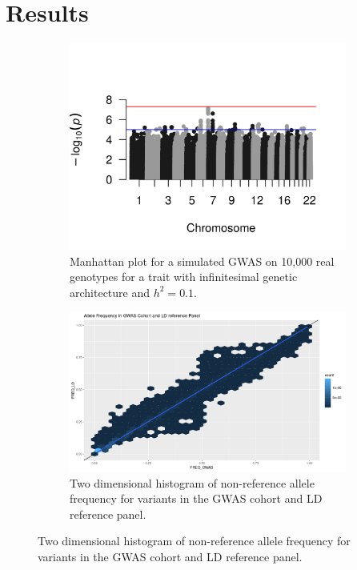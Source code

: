 \section{Results}\label{sec:org26555b8}

\begin{figure}
  \centering
  \begin{subfigure}[t]{\textwidth}
    \centering
    \includegraphics[width=\linewidth]{img/rssp_01.png}
    \caption{Manhattan plot for a simulated GWAS on 10,000 real genotypes for a trait with infinitesimal genetic architecture and $h^2=0.1$.  }\label{fig:gwas_01}
  \end{subfigure}
    \begin{subfigure}[t]{\textwidth}
    \centering
    \includegraphics[width=\linewidth]{img/Allele_freq_match.png}
    \caption{Two dimensional histogram of non-reference allele frequency for variants in the GWAS cohort and LD reference panel.}\label{fig:gwas_af_match}
  \end{subfigure}
\end{figure}

